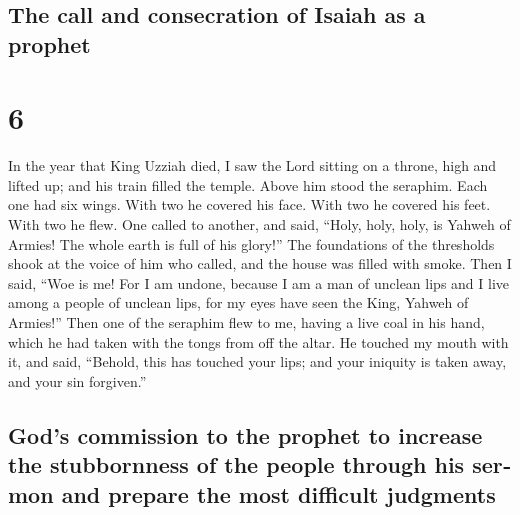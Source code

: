 \begin{paracol}{2}
\switchcolumn
\begin{otherlanguage}{english}

\hypertarget{the-call-and-consecration-of-isaiah-as-a-prophet}{%
\subsection{The call and consecration of Isaiah as a
prophet}\label{the-call-and-consecration-of-isaiah-as-a-prophet}}

\hypertarget{section-11}{%
\section{6}\label{section-11}}

 In the year that King Uzziah died, I saw the Lord sitting
on a throne, high and lifted up; and his train filled the temple.
 Above him stood the seraphim. Each one had six wings.
With two he covered his face. With two he covered his feet. With two he
flew.  One called to another, and said, ``Holy, holy,
holy, is Yahweh of Armies! The whole earth is full of his glory!''
 The foundations of the thresholds shook at the voice of
him who called, and the house was filled with smoke.  Then
I said, ``Woe is me! For I am undone, because I am a man of unclean lips
and I live among a people of unclean lips, for my eyes have seen the
King, Yahweh of Armies!''  Then one of the seraphim flew
to me, having a live coal in his hand, which he had taken with the tongs
from off the altar.  He touched my mouth with it, and
said, ``Behold, this has touched your lips; and your iniquity is taken
away, and your sin forgiven.''

\hypertarget{gods-commission-to-the-prophet-to-increase-the-stubbornness-of-the-people-through-his-sermon-and-prepare-the-most-difficult-judgments}{%
\subsection{God's commission to the prophet to increase the stubbornness
of the people through his sermon and prepare the most difficult
judgments}\label{gods-commission-to-the-prophet-to-increase-the-stubbornness-of-the-people-through-his-sermon-and-prepare-the-most-difficult-judgments}}


\end{otherlanguage}
\end{paracol}
